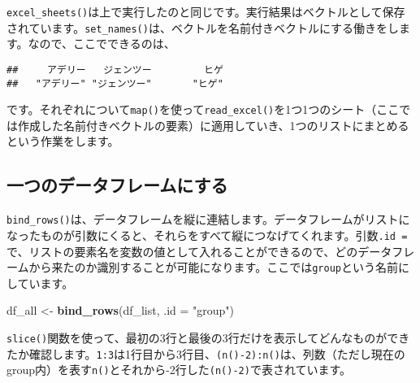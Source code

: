 \documentclass[
  xelatex,ja=standard, b5paper]{bxjsbook}
\newenvironment{Shaded}{\begin{snugshade}}{\end{snugshade}}
\newcommand{\DataTypeTok}[1]{\textcolor[rgb]{0.13,0.29,0.53}{#1}}
\newcommand{\DecValTok}[1]{\textcolor[rgb]{0.00,0.00,0.81}{#1}}
\newcommand{\KeywordTok}[1]{\textcolor[rgb]{0.13,0.29,0.53}{\textbf{#1}}}
\newcommand{\NormalTok}[1]{#1}
\newcommand{\OperatorTok}[1]{\textcolor[rgb]{0.81,0.36,0.00}{\textbf{#1}}}
\newcommand{\StringTok}[1]{\textcolor[rgb]{0.31,0.60,0.02}{#1}}
\begin{document}
\texttt{excel\_sheets()}は上で実行したのと同じです。実行結果はベクトルとして保存されています。\texttt{set\_names()}は、ベクトルを名前付きベクトルにする働きをします。なので、ここでできるのは、

\begin{Shaded}
\end{Shaded}

\begin{verbatim}
##     アデリー   ジェンツー         ヒゲ 
##   "アデリー" "ジェンツー"       "ヒゲ"
\end{verbatim}

です。それぞれについて\texttt{map()}を使って\texttt{read\_excel()}を1つ1つのシート（ここでは作成した名前付きベクトルの要素）に適用していき、1つのリストにまとめるという作業をします。

\hypertarget{ux4e00ux3064ux306eux30c7ux30fcux30bfux30d5ux30ecux30fcux30e0ux306bux3059ux308b}{%
\subsection{一つのデータフレームにする}\label{ux4e00ux3064ux306eux30c7ux30fcux30bfux30d5ux30ecux30fcux30e0ux306bux3059ux308b}}

\texttt{bind\_rows()}は、データフレームを縦に連結します。データフレームがリストになったものが引数にくると、それらをすべて縦につなげてくれます。引数\texttt{.id\ =}で、リストの要素名を変数の値として入れることができるので、どのデータフレームから来たのか識別することが可能になります。ここでは\texttt{group}という名前にしています。

\begin{Shaded}
\begin{Highlighting}[]
\NormalTok{df_all <-}\StringTok{ }
\KeywordTok{bind_rows}\NormalTok{(df_list, }\DataTypeTok{.id =} \StringTok{"group"}\NormalTok{)}
\end{Highlighting}
\end{Shaded}

\texttt{slice()}関数を使って、最初の3行と最後の3行だけを表示してどんなものができたか確認します。\texttt{1:3}は1行目から3行目、\texttt{(n()-2):n()}は、列数（ただし現在のgroup内）を表す\texttt{n()}とそれから-2行した\texttt{(n()-2)}で表されています。

\begin{Shaded}
\end{Shaded}
\end{document}
